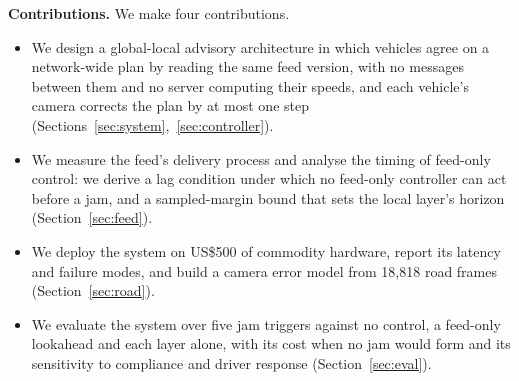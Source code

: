 \noindent\textbf{Contributions.} We make four contributions.
\begin{itemize}[leftmargin=1.2em,itemsep=1pt,topsep=2pt]
\item We design a global-local advisory architecture in which vehicles agree on a network-wide plan by reading the same feed version, with no messages between them and no server computing their speeds, and each vehicle's camera corrects the plan by at most one step (Sections~\ref{sec:system},~\ref{sec:controller}).
\item We measure the feed's delivery process and analyse the timing of feed-only control: we derive a lag condition under which no feed-only controller can act before a jam, and a sampled-margin bound that sets the local layer's horizon (Section~\ref{sec:feed}).
\item We deploy the system on US\$500 of commodity hardware, report its latency and failure modes, and build a camera error model from 18,818 road frames (Section~\ref{sec:road}).
\item We evaluate the system over five jam triggers against no control, a feed-only lookahead and each layer alone, with its cost when no jam would form and its sensitivity to compliance and driver response (Section~\ref{sec:eval}).
\end{itemize}
